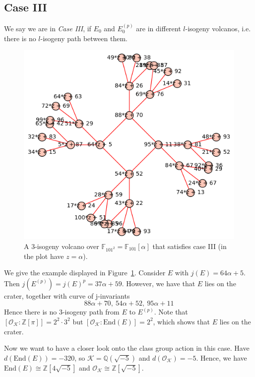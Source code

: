 \documentclass{scrartcl}
\newcommand{\Z}{\mathbb{Z}}
\newcommand{\F}{\mathbb{F}}
\newcommand{\End}{\mathrm{End}}
\newcommand{\K}{\mathcal{K}}
\renewcommand{\O}{\mathcal{O}}
\theoremstyle{definition}
\begin{document}
\subsection{Case III}
We say we are in \emph{Case III}, if $E_0$ and $E_0^{(p)}$ are in different $l$-isogeny volcanos, i.e. there is no $l$-isogeny path between them.

\begin{figure}
    \includegraphics{./example_III.png}
    \caption{\label{fig:example_III} A 3-isogeny volcano over $\F_{101^2} = \F_{101}[\alpha]$ that satisfies case III (in the plot have $z = \alpha$).}
\end{figure}
We give the example displayed in Figure~\ref{fig:example_III}.
Consider $E$ with $j(E) = 64\alpha + 5$.
Then $j(E^{(p)}) = j(E)^p = 37\alpha + 59$.
However, we have that $E$ lies on the crater, together with curve of j-invariants
\begin{equation*}
    88\alpha + 70, \ 54\alpha + 52, \ 95\alpha + 11
\end{equation*}
Hence there is no 3-isogeny path from $E$ to $E^{(p)}$.
Note that $[\O_\K : \Z[\pi]] = 2^2 \cdot 3^2$ but $[\O_\K : \End(E)] = 2^2$, which shows that $E$ lies on the crater.

Now we want to have a closer look onto the class group action in this case.
Have $d(\End(E)) = -320$, so $\K = \mathbb{Q}(\sqrt{-5})$ and $d(\O_\K) = -5$.
Hence, we have $\End(E) \cong \Z[4\sqrt{-5}]$ and $\O_\K \cong \Z[\sqrt{-5}]$.
\end{document}

